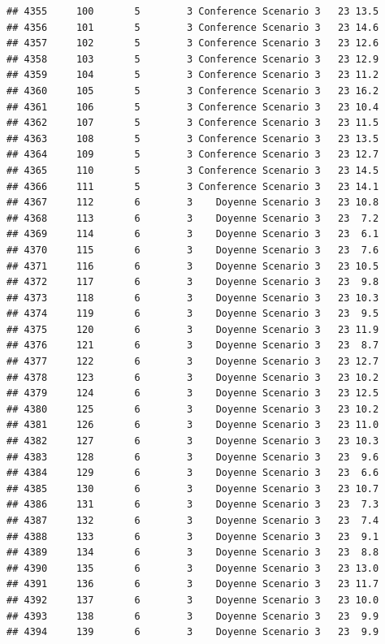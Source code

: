 \documentclass[
]{article}
\begin{document}
\begin{verbatim}
## 4355     100       5        3 Conference Scenario 3   23 13.5
## 4356     101       5        3 Conference Scenario 3   23 14.6
## 4357     102       5        3 Conference Scenario 3   23 12.6
## 4358     103       5        3 Conference Scenario 3   23 12.9
## 4359     104       5        3 Conference Scenario 3   23 11.2
## 4360     105       5        3 Conference Scenario 3   23 16.2
## 4361     106       5        3 Conference Scenario 3   23 10.4
## 4362     107       5        3 Conference Scenario 3   23 11.5
## 4363     108       5        3 Conference Scenario 3   23 13.5
## 4364     109       5        3 Conference Scenario 3   23 12.7
## 4365     110       5        3 Conference Scenario 3   23 14.5
## 4366     111       5        3 Conference Scenario 3   23 14.1
## 4367     112       6        3    Doyenne Scenario 3   23 10.8
## 4368     113       6        3    Doyenne Scenario 3   23  7.2
## 4369     114       6        3    Doyenne Scenario 3   23  6.1
## 4370     115       6        3    Doyenne Scenario 3   23  7.6
## 4371     116       6        3    Doyenne Scenario 3   23 10.5
## 4372     117       6        3    Doyenne Scenario 3   23  9.8
## 4373     118       6        3    Doyenne Scenario 3   23 10.3
## 4374     119       6        3    Doyenne Scenario 3   23  9.5
## 4375     120       6        3    Doyenne Scenario 3   23 11.9
## 4376     121       6        3    Doyenne Scenario 3   23  8.7
## 4377     122       6        3    Doyenne Scenario 3   23 12.7
## 4378     123       6        3    Doyenne Scenario 3   23 10.2
## 4379     124       6        3    Doyenne Scenario 3   23 12.5
## 4380     125       6        3    Doyenne Scenario 3   23 10.2
## 4381     126       6        3    Doyenne Scenario 3   23 11.0
## 4382     127       6        3    Doyenne Scenario 3   23 10.3
## 4383     128       6        3    Doyenne Scenario 3   23  9.6
## 4384     129       6        3    Doyenne Scenario 3   23  6.6
## 4385     130       6        3    Doyenne Scenario 3   23 10.7
## 4386     131       6        3    Doyenne Scenario 3   23  7.3
## 4387     132       6        3    Doyenne Scenario 3   23  7.4
## 4388     133       6        3    Doyenne Scenario 3   23  9.1
## 4389     134       6        3    Doyenne Scenario 3   23  8.8
## 4390     135       6        3    Doyenne Scenario 3   23 13.0
## 4391     136       6        3    Doyenne Scenario 3   23 11.7
## 4392     137       6        3    Doyenne Scenario 3   23 10.0
## 4393     138       6        3    Doyenne Scenario 3   23  9.9
## 4394     139       6        3    Doyenne Scenario 3   23  9.9

\end{verbatim}
\end{document}
